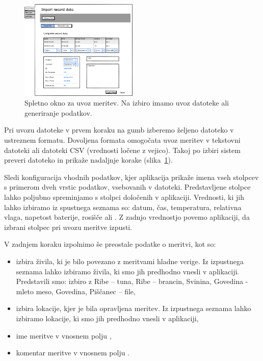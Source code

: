 \documentclass[a4paper, 12pt]{book}
\begin{document}
\begin{figure}[h]
\begin{center}
\includegraphics[width=0.5\textwidth]{slike/Import-data.png}
\end{center}
\caption{Spletno okno za uvoz meritev. Na izbiro imamo uvoz datoteke ali generiranje podatkov.}
\label{import-data-wireframe}
\end{figure}

Pri uvozu datoteke v prvem koraku na gumb  izberemo željeno datoteko v ustreznem formatu. Dovoljena formata omogočata uvoz meritev v tekstovni datoteki ali datoteki CSV (vrednosti ločene z vejico). Takoj po izbiri sistem preveri datoteko in prikaže nadaljnje korake (slika~\ref{import-data-wireframe}).

Sledi konfiguracija vhodnih podatkov, kjer aplikacija prikaže imena vseh stolpcev s primerom dveh vrstic podatkov, vsebovanih v datoteki. Predstavljene stolpce lahko poljubno spreminjamo s stolpci določenih v aplikaciji. Vrednosti, ki jih lahko izbiramo iz spustnega seznama so: datum, čas, temperatura, relativna vlaga, napetost baterije, rosišče ali . Z zadnjo vrednostjo povemo aplikaciji, da izbrani stolpec pri uvozu meritve izpusti.

\noindent V zadnjem koraku izpolnimo še preostale podatke o meritvi, kot so: 
\begin{itemize}
	\item izbira živila, ki je bilo povezano z meritvami hladne verige. Iz izpustnega seznama  lahko izbiramo živila, ki smo jih predhodno vnesli v aplikaciji. Predstavili smo: izbiro z Ribe – tuna, Ribe – brancin, Svinina, Govedina - mleto meso, Govedina, Piščanec – file,
	
	\item izbira lokacije, kjer je bila opravljena meritev. Iz izpustnega seznama  lahko izbiramo lokacije, ki smo jih predhodno vnesli v aplikaciji,
	
	\item ime meritve v vnosnem polju ,
	
	\item komentar meritve v vnosnem polju .
\end{itemize}
\end{document}
